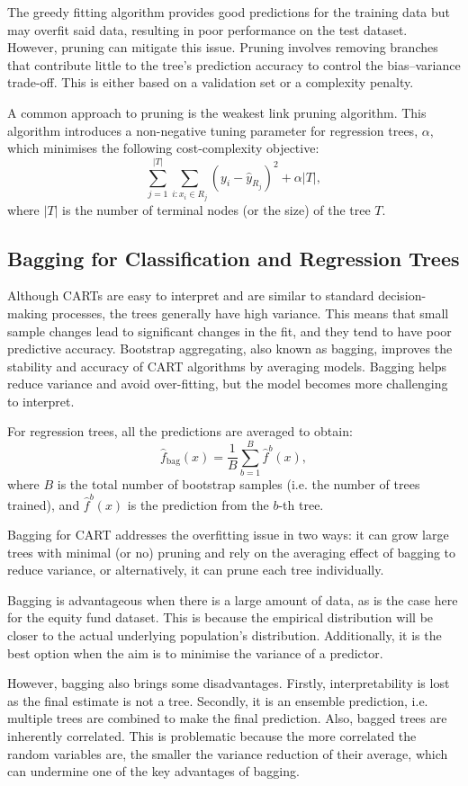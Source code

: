\documentclass[11pt]{report} %
\begin{document}
The greedy fitting algorithm provides good predictions for the training data but may overfit said data, resulting in poor performance on the test dataset. However, pruning can mitigate this issue. Pruning involves removing branches that contribute little to the tree's prediction accuracy to control the bias–variance trade-off. This is either based on a validation set or a complexity penalty.

A common approach to pruning is the weakest link pruning algorithm. This algorithm introduces a non-negative tuning parameter for regression trees, $\alpha$, which minimises the following cost-complexity objective:
\[
\sum_{j=1}^{|T|} \sum_{i : x_i \in R_j} (y_i - \hat{y}_{R_j})^2 + \alpha |T|,
\]
where $|T|$ is the number of terminal nodes (or the size) of the tree $T$.

\subsection{Bagging for Classification and Regression Trees}
Although CARTs are easy to interpret and are similar to standard decision-making processes, the trees generally have high variance. This means that small sample changes lead to significant changes in the fit, and they tend to have poor predictive accuracy. Bootstrap aggregating, also known as bagging, improves the stability and accuracy of CART algorithms by averaging models. Bagging helps reduce variance and avoid over-fitting, but the model becomes more challenging to interpret.

\noindent For regression trees, all the predictions are averaged to obtain:
\[
\hat{f}_{\text{bag}}(x) = \frac{1}{B} \sum_{b=1}^B \hat{f}^b(x),
\]
where \( B \) is the total number of bootstrap samples (i.e. the number of trees trained), and \( \hat{f}^b(x) \) is the prediction from the \( b \)-th tree.

Bagging for CART addresses the overfitting issue in two ways: it can grow large trees with minimal (or no) pruning and rely on the averaging effect of bagging to reduce variance, or alternatively, it can prune each tree individually.

Bagging is advantageous when there is a large amount of data, as is the case here for the equity fund dataset. This is because the empirical distribution will be closer to the actual underlying population's distribution. Additionally, it is the best option when the aim is to minimise the variance of a predictor. 

However, bagging also brings some disadvantages. Firstly, interpretability is lost as the final estimate is not a tree. Secondly, it is an ensemble prediction, i.e. multiple trees are combined to make the final prediction.\cite{DataScienceProcess2019} Also, bagged trees are inherently correlated. This is problematic because the more correlated the random variables are, the smaller the variance reduction of their average, which can undermine one of the key advantages of bagging. 
\end{document}

